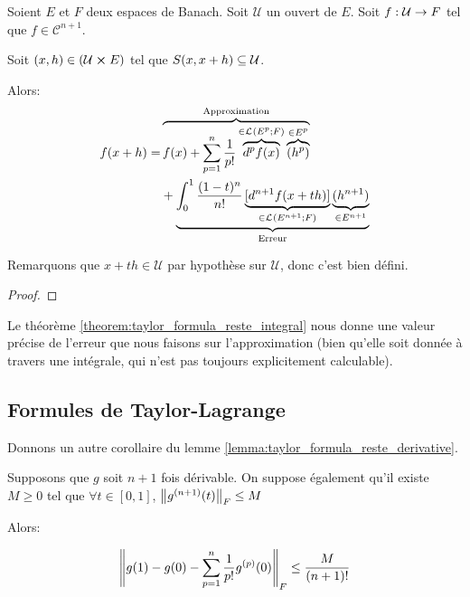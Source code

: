 \begin{theorem} 
	\label{theorem:taylor_formula_reste_integral}
	Soient $E$ et $F$ deux espaces de Banach. Soit $\mathcal{U}$ un ouvert de
	$E$.
	Soit $f : \mathcal{U} \rightarrow F$ tel que $f \in \mathcal{C}^{n + 1}$.

	Soit $(x, h) \in (\mathcal{U} \cross E)$ tel que $S(x, x + h)
	\subseteq \mathcal{U}$.

	Alors:
	\begin{align*}
		f(x + h) = & \overbrace
		{
			f(x) + \displaystyle \sum_{p = 1}^{n} \frac{1}{p!}
			\overbrace{d^{p}f(x)}^{\in \mathcal{L}_{}(E^{p}; F)}
			\overbrace{(h^{p})}^{\in E^{p}}
		}^{\text{Approximation}} \\
		& + \underbrace
		{
			\int_{0}^{1} \frac{(1 - t)^{n}}{n!} \underbrace{[d^{n + 1}f(x +
			th)]}_{\in \mathcal{L}_{}(E^{n+1}; F)} \underbrace{(h^{n+1})}_{\in E^{n +
			1}}
		}_{\text{Erreur}}
	\end{align*}

	Remarquons que $x + th \in \mathcal{U}$ par hypothèse sur $\mathcal{U}$,
	donc c'est bien défini.
\end{theorem}

\ifdefined\outputproof
\begin{proof}

\end{proof}
\fi

Le théorème \ref{theorem:taylor_formula_reste_integral} nous donne une valeur
précise de l'erreur que nous faisons sur l'approximation (bien qu'elle soit
donnée à travers une intégrale, qui n'est pas toujours explicitement
calculable).

\subsection{Formules de Taylor-Lagrange}

Donnons un autre corollaire du lemme
\ref{lemma:taylor_formula_reste_derivative}.

\begin{corollary}
	Supposons que $g$ soit $n + 1$ fois dérivable.
	On suppose également qu'il existe $M \geq 0$ tel que $\forall t \in [0, 1]$,
	$\norm{g^{(n + 1)}(t)}_{F} \leq M$

	Alors:

	\begin{equation*}
		\norm{g(1) - g(0) - \displaystyle \sum_{p = 1}^{n} \frac{1}{p!}
		g^{(p)}(0)}_{F} \leq \frac{M}{(n + 1)!}
	\end{equation*}
\end{corollary}

